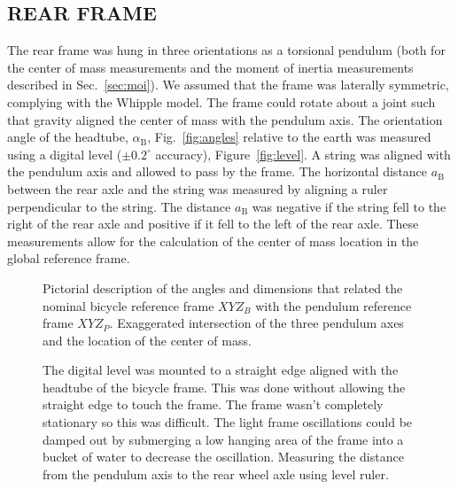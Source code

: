 \documentclass{bmd2010p}
\begin{document}
\subsection{REAR FRAME}
The rear frame was hung in three orientations as a torsional pendulum (both for
the center of mass measurements and the moment of inertia measurements
described in Sec.~\ref{sec:moi}). We assumed that the frame was laterally
symmetric, complying with the Whipple model. The frame could rotate about a joint
such that gravity aligned the center of mass with the pendulum axis. The
orientation angle of the headtube, $\alpha_\mathrm{B}$, Fig.~\ref{fig:angles} relative
to the earth was measured using a digital level ($\pm0.2^{\circ}$ accuracy),
Figure~\ref{fig:level}. A string was aligned with the pendulum axis
and allowed to pass by the frame. The horizontal distance $a_\mathrm{B}$ between the rear
axle and the string was measured by aligning a ruler perpendicular to
the string. The distance $a_\mathrm{B}$ was negative if the string fell to the right of
the rear axle and positive if it fell to the left of the rear axle. These
measurements allow for the calculation of the center of mass location in the
global reference frame.
\begin{figure}[tb]
    \centering
    \caption{ Pictorial description of the angles and dimensions that related
    the nominal bicycle reference frame $XYZ_B$ with the pendulum reference frame
    $XYZ_P$.  Exaggerated intersection of the three pendulum axes and the
    location of the center of mass.}
\end{figure}
\begin{figure}[tb]
    \centering
    \quad
    \caption{ The digital level was mounted to a straight edge aligned
    with the headtube of the bicycle frame. This was done without allowing the
    straight edge to touch the frame. The frame wasn't completely stationary so
    this was difficult. The light frame oscillations could be damped out by
    submerging a low hanging area of the frame into a bucket of water to
    decrease the oscillation.  Measuring the distance from
    the pendulum axis to the rear wheel axle using level ruler.}
\end{figure}
\end{document}
